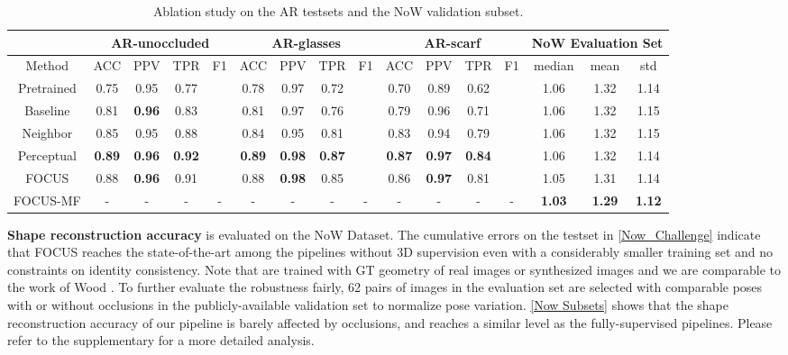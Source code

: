 \documentclass[10pt,twocolumn,letterpaper]{article}
\begin{document}
  
  \begin{table*}[t!]
  \caption{Ablation study on the AR testsets and the NoW validation subset.}
  \label{mask acc: Ablation}
  \centering
  \footnotesize
  \renewcommand{\arraystretch}{0.95}
  \setlength{\tabcolsep}{1.0mm}
  \setlength{\abovecaptionskip}{1mm}
  \setlength{\belowcaptionskip}{1mm}
  
  {
  \tabcolsep=0.1cm
  \begin{tabular}{	c|cccc|cccc|cccc|ccc}
     \hline
    & \multicolumn{4}{|c|}{AR-unoccluded} & \multicolumn{4}{|c|}{AR-glasses} &\multicolumn{4}{|c}{AR-scarf}&\multicolumn{3}{|c}{NoW Evaluation Set}\\
    \hline

     
    Method  & ACC & PPV  & TPR& F1  & ACC & PPV & TPR& F1 & ACC & PPV & TPR & F1 &median & mean & std \\
    \hline
    Pretrained & 0.75 &  0.95 &  0.77 &   & 
    0.78 &  0.97 &  0.72 &    &
    0.70 &  0.89 &  0.62 &   &
    1.06&1.32&1.14\\
   
    Baseline   & 0.81 &  \textbf{0.96} &  0.83 &    &
    0.81 &  0.97 &  0.76 &   &
    0.79 &  0.96 &  0.71 &   &
    1.06&1.32&1.15\\
    
    Neighbor  &0.85 &  0.95 &  0.88 &  &
    0.84 &  0.95 &  0.81 &  &
    0.83 &  0.94 &  0.79 &  &
    1.06 & 1.32 & 1.15\\
    Perceptual & \textbf{0.89} &  \textbf{0.96} &  \textbf{0.92} & \bm{}  &
    \textbf{0.89} &  \textbf{0.98} &  \textbf{0.87} & \bm{}   & 
    \textbf{0.87} &  \textbf{0.97} &  \textbf{0.84} & \bm{}  & 1.06&1.32&1.14 \\
    FOCUS   & 0.88 &  \textbf{0.96} &  0.91 &   &
     0.88 &  \textbf{0.98} &  0.85 &   &
    0.86 &  \textbf{0.97} &  0.81 &  &
    1.05&1.31&1.14\\
    FOCUS-MF & -& -& -& -& -& -& -& -& -& -& -& -& \textbf{1.03} & \textbf{1.29} & \textbf{1.12}\\
  \end{tabular}
  }
  \end{table*}

  
\textbf{Shape reconstruction accuracy} is evaluated on the NoW Dataset. The cumulative errors on the testset in \cref{Now_Challenge} indicate that FOCUS reaches the state-of-the-art among the pipelines without 3D supervision even with a considerably smaller training set and no constraints on identity consistency. Note that \cite{zielonka2022towards,wood20223d} are trained with GT geometry of real images or synthesized images and we are comparable to the work of Wood \etal \cite{wood20223d}. To further evaluate the robustness fairly, 62 pairs of images in the evaluation set are selected with comparable poses with or without occlusions in the publicly-available validation set to normalize pose variation. \cref{Now Subsets} shows that the shape reconstruction accuracy of our pipeline is barely affected by occlusions, and reaches a similar level as the fully-supervised pipelines. Please refer to the supplementary for a more detailed analysis.
\end{document}
